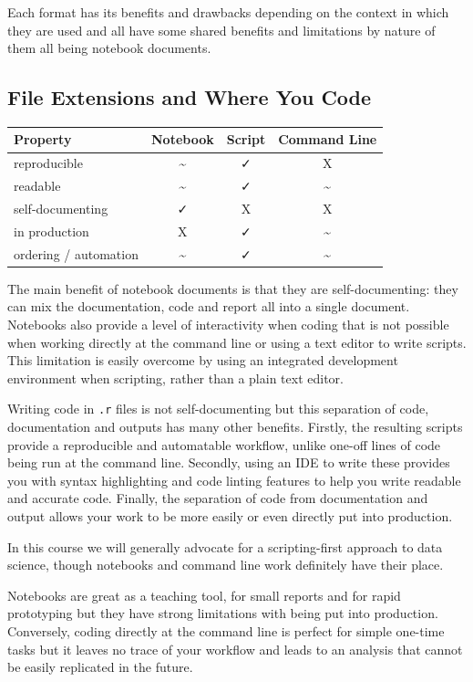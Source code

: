 \documentclass[
  letterpaper,
  DIV=11,
  numbers=noendperiod]{scrreprt}
\begin{document}
Each format has its benefits and drawbacks depending on the context in
which they are used and all have some shared benefits and limitations by
nature of them all being notebook documents.

\subsection{File Extensions and Where You
Code}\label{file-extensions-and-where-you-code}

\begin{longtable}[]{@{}lccc@{}}
\toprule\noalign{}
Property & Notebook & Script & Command Line \\
\midrule\noalign{}
\endhead
\bottomrule\noalign{}
\endlastfoot
reproducible & \textasciitilde{} & ✓ & X \\
readable & \textasciitilde{} & ✓ & \textasciitilde{} \\
self-documenting & ✓ & X & X \\
in production & X & ✓ & \textasciitilde{} \\
ordering / automation & \textasciitilde{} & ✓ & \textasciitilde{} \\
\end{longtable}

The main benefit of notebook documents is that they are
self-documenting: they can mix the documentation, code and report all
into a single document. Notebooks also provide a level of interactivity
when coding that is not possible when working directly at the command
line or using a text editor to write scripts. This limitation is easily
overcome by using an integrated development environment when scripting,
rather than a plain text editor.

Writing code in \texttt{.r} files is not self-documenting but this
separation of code, documentation and outputs has many other benefits.
Firstly, the resulting scripts provide a reproducible and automatable
workflow, unlike one-off lines of code being run at the command line.
Secondly, using an IDE to write these provides you with syntax
highlighting and code linting features to help you write readable and
accurate code. Finally, the separation of code from documentation and
output allows your work to be more easily or even directly put into
production.

In this course we will generally advocate for a scripting-first approach
to data science, though notebooks and command line work definitely have
their place.

Notebooks are great as a teaching tool, for small reports and for rapid
prototyping but they have strong limitations with being put into
production. Conversely, coding directly at the command line is perfect
for simple one-time tasks but it leaves no trace of your workflow and
leads to an analysis that cannot be easily replicated in the future.
\end{document}
